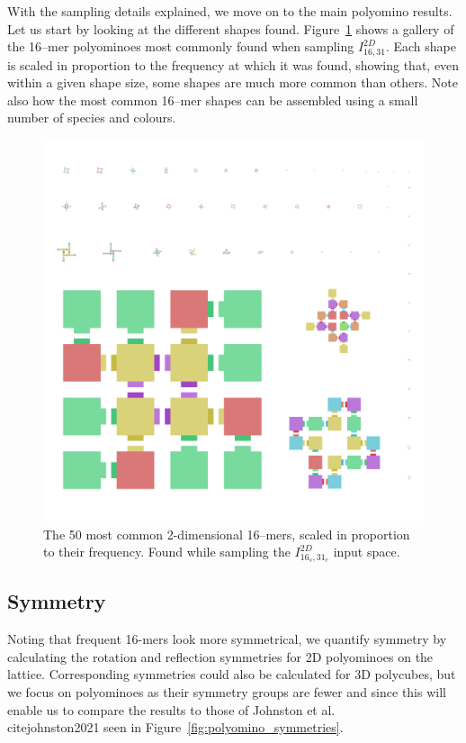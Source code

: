 With the sampling details explained, we move on to the main polyomino results. Let us start by looking at the different shapes found. Figure~\ref{fig:16-mer_2d_zoo} shows a gallery of the 16--mer polyominoes most commonly found when sampling \(I_{16,31}^{2D}\). Each shape is scaled in proportion to the frequency at which it was found, showing that, even within a given shape size, some shapes are much more common than others. Note also how the most common 16--mer shapes can be assembled using a small number of species and colours.

\begin{figure}[h]
    \centering
    \includegraphics[width=\textwidth]{figures/16-mers_2d.png}
    \caption{The 50 most common 2-dimensional 16--mers, scaled in proportion to their frequency. Found while sampling the \(I_{16_s,31_c}^{2D}\) input space.}
    \label{fig:16-mer_2d_zoo}
\end{figure}

\subsection{Symmetry}

Noting that frequent 16-mers look more symmetrical, we quantify symmetry by calculating the rotation and reflection symmetries for 2D polyominoes on the lattice. Corresponding symmetries could also be calculated for 3D polycubes, but we focus on polyominoes as their symmetry groups are fewer and since this will enable us to compare the results to those of Johnston et al.\\cite{johnston2021} seen in Figure~\ref{fig:polyomino_symmetries}.

